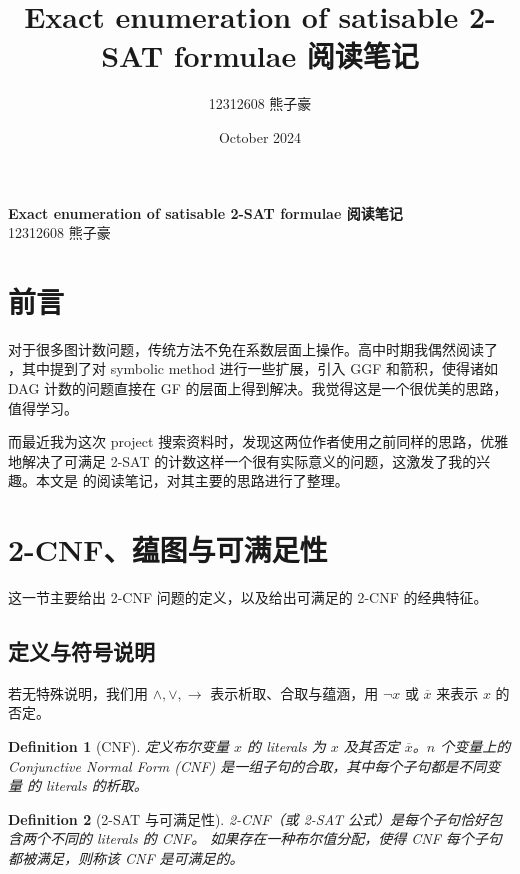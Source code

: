 \documentclass[10pt,a4paper,oneside]{article}
\title{Exact enumeration of satisable 2-SAT formulae 阅读笔记}
\author{12312608 熊子豪}
\date{October 2024}
\newtheorem{definition}{Definition}[section]
\begin{document}
\begin{center}
{\textbf {\huge Exact enumeration of satisable 2-SAT formulae 阅读笔记}}\\[5mm]
{\large 12312608 熊子豪} \\[5mm]
\end{center}

\tableofcontents  %

\newpage

\section{前言}

对于很多图计数问题，传统方法不免在系数层面上操作。高中时期我偶然阅读了 \cite{de2019symbolic}，其中提到了对 symbolic method 进行一些扩展，引入 GGF 和箭积，使得诸如 DAG 计数的问题直接在 GF 的层面上得到解决。我觉得这是一个很优美的思路，值得学习。

而最近我为这次 project 搜索资料时，发现这两位作者使用之前同样的思路，优雅地解决了可满足 2-SAT 的计数这样一个很有实际意义的问题，这激发了我的兴趣。本文是 \cite{dovgal2021exact} 的阅读笔记，对其主要的思路进行了整理。

\section{2-CNF、蕴图与可满足性}

这一节主要给出 2-CNF 问题的定义，以及给出可满足的 2-CNF 的经典特征。

\subsection{定义与符号说明}

若无特殊说明，我们用 $\land, \lor, \to$ 表示析取、合取与蕴涵，用 $\neg x$ 或 $\overline{x}$ 来表示 $x$ 的否定。

\begin{definition}[CNF]
    定义布尔变量 $x$ 的 literals 为 $x$ 及其否定 $\overline{x}$。$n$ 个变量上的 Conjunctive Normal Form (CNF) 是一组子句的合取，其中每个子句都是不同变量 的 literals 的析取。
\end{definition}

\begin{definition}[2-SAT 与可满足性]
    2-CNF（或 2-SAT 公式）是每个子句恰好包含两个不同的 literals 的 CNF。
    如果存在一种布尔值分配，使得 CNF 每个子句都被满足，则称该 CNF 是可满足的。
\end{definition}
\end{document}
